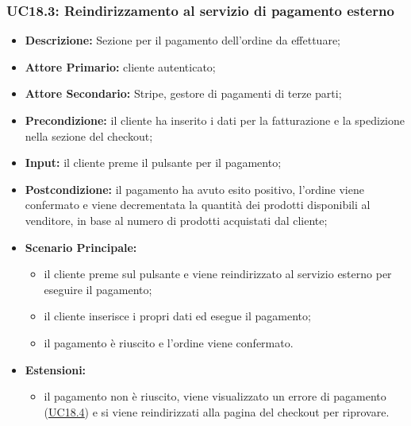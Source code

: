             \subsubsection{UC18.3: Reindirizzamento al servizio di pagamento esterno}
            \label{sec:UC18.3}
                \begin{itemize}
                    \item \textbf{Descrizione:} Sezione per il pagamento dell'ordine da effettuare;
                    \item \textbf{Attore Primario:} cliente autenticato;
                    \item \textbf{Attore Secondario:} Stripe, gestore di pagamenti di terze parti;
                    \item \textbf{Precondizione:} il cliente ha inserito i dati per la fatturazione e la spedizione nella sezione del checkout;
                    \item \textbf{Input:} il cliente preme il pulsante per il pagamento;
                    \item \textbf{Postcondizione:} il pagamento ha avuto esito positivo, l'ordine viene confermato e viene decrementata la quantità dei prodotti disponibili al venditore, in base al numero di prodotti acquistati dal cliente;
                    \item \textbf{Scenario Principale:}
                    \begin{itemize}
                        \item il cliente preme sul pulsante e viene reindirizzato al servizio esterno per eseguire il pagamento;
                        \item il cliente inserisce i propri dati ed esegue il pagamento;
                        \item il pagamento è riuscito e l'ordine viene confermato.
                    \end{itemize}
                    \item \textbf{Estensioni:}
                    \begin{itemize}
                        \item il pagamento non è riuscito, viene visualizzato un errore di pagamento (\hyperref[sec:UC18.4]{\underline{UC18.4}}) e si viene reindirizzati alla pagina del checkout per riprovare.
                    \end{itemize}
                \end{itemize}
